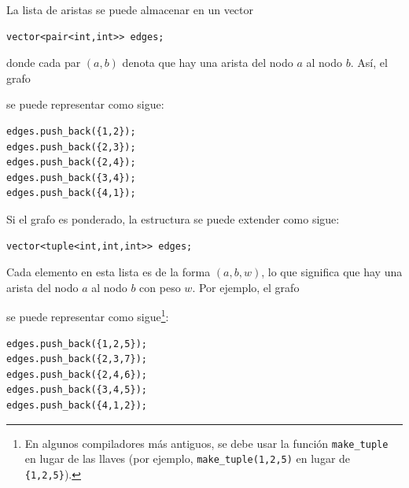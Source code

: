 La lista de aristas se puede almacenar en un vector
\begin{lstlisting}
vector<pair<int,int>> edges;
\end{lstlisting}
donde cada par $(a,b)$ denota que
hay una arista del nodo $a$ al nodo $b$.
Así, el grafo

\begin{center}
\end{center}
se puede representar como sigue:
\begin{lstlisting}
edges.push_back({1,2});
edges.push_back({2,3});
edges.push_back({2,4});
edges.push_back({3,4});
edges.push_back({4,1});
\end{lstlisting}

\noindent
Si el grafo es ponderado, la estructura se puede
extender como sigue:
\begin{lstlisting}
vector<tuple<int,int,int>> edges;
\end{lstlisting}
Cada elemento en esta lista es de la
forma $(a,b,w)$, lo que significa que hay
una arista del nodo $a$ al nodo $b$ con peso $w$.
Por ejemplo, el grafo

\begin{center}
\end{center}
\begin{samepage}
se puede representar como sigue\footnote{En algunos compiladores más antiguos, se debe usar la función
\texttt{make\_tuple} en lugar de las llaves (por ejemplo,
\texttt{make\_tuple(1,2,5)} en lugar de \texttt{\{1,2,5\}}).}:
\begin{lstlisting}
edges.push_back({1,2,5});
edges.push_back({2,3,7});
edges.push_back({2,4,6});
edges.push_back({3,4,5});
edges.push_back({4,1,2});
\end{lstlisting}
\end{samepage}
